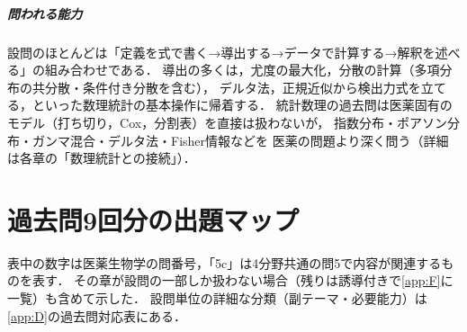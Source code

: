 \documentclass[a4paper,11pt,openany]{ltjsbook}
\begin{document}
\enlargethispage{4\baselineskip}
\paragraph{問われる能力}
設問のほとんどは「定義を式で書く→導出する→データで計算する→解釈を述べる」の組み合わせである．
導出の多くは，尤度の最大化，分散の計算（多項分布の共分散・条件付き分散を含む），
デルタ法，正規近似から検出力式を立てる，といった数理統計の基本操作に帰着する．
統計数理の過去問は医薬固有のモデル（打ち切り，Cox，分割表）を直接は扱わないが，
指数分布・ポアソン分布・ガンマ混合・デルタ法・Fisher情報などを
医薬の問題より深く問う（詳細は各章の「数理統計との接続」）．

\chapter*{過去問9回分の出題マップ}

表中の数字は医薬生物学の問番号，「5c」は4分野共通の問5で内容が関連するものを表す．
その章が設問の一部しか扱わない場合（残りは誘導付きで\cref{app:F}に一覧）も含めて示した．
設問単位の詳細な分類（副テーマ・必要能力）は\cref{app:D}の過去問対応表にある．
\end{document}

